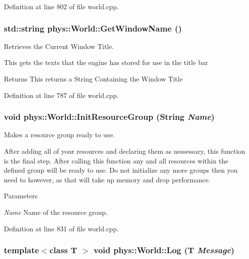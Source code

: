 Definition at line 802 of file world.cpp.

\hypertarget{classphys_1_1World_a1f0139bbc9561bcf18844be25e4adc73}{
\subsubsection[{GetWindowName}]{\setlength{\rightskip}{0pt plus 5cm}std::string phys::World::GetWindowName ()}}
\label{da/ddf/classphys_1_1World_a1f0139bbc9561bcf18844be25e4adc73}


Retrieves the Current Window Title. 

This gets the texts that the engine has stored for use in the title bar \begin{DoxyReturn}{Returns}
This returns a String Containing the Window Title 
\end{DoxyReturn}


Definition at line 787 of file world.cpp.

\hypertarget{classphys_1_1World_a82b1b40f39c1f2e48759fdb77389153d}{
\subsubsection[{InitResourceGroup}]{\setlength{\rightskip}{0pt plus 5cm}void phys::World::InitResourceGroup ({\bf String} {\em Name})}}
\label{da/ddf/classphys_1_1World_a82b1b40f39c1f2e48759fdb77389153d}


Makes a resource group ready to use. 

After adding all of your resources and declaring them as nessessary, this function is the final step. After calling this function any and all resources within the defined group will be ready to use. Do not initialize any more groups then you need to however, as that will take up memory and drop performance. 
\begin{DoxyParams}{Parameters}
\item[{\em Name}]Name of the resource group. \end{DoxyParams}


Definition at line 831 of file world.cpp.

\hypertarget{classphys_1_1World_a05267a20e8d5518771d0848190b33d60}{
\subsubsection[{Log}]{\setlength{\rightskip}{0pt plus 5cm}template$<$class T $>$ void phys::World::Log (T {\em Message})}}
\label{da/ddf/classphys_1_1World_a05267a20e8d5518771d0848190b33d60}


